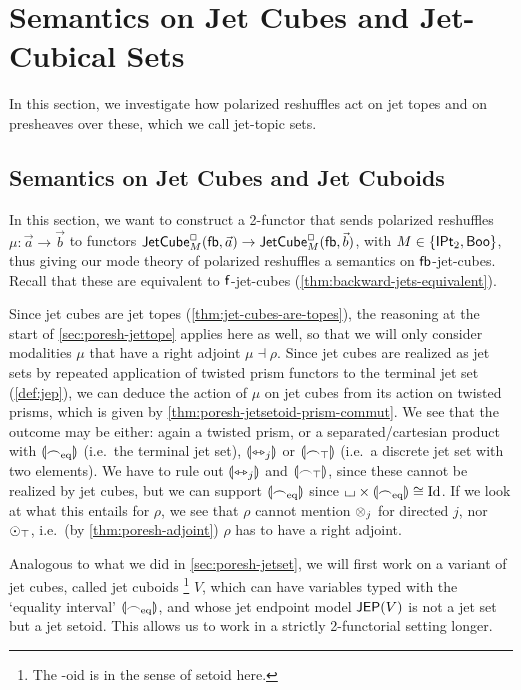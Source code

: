 \documentclass[a4paper]{memoir}
\begin{document}
\section{Semantics on Jet Cubes and Jet-Cubical Sets} \label{sec:poresh-jetcube-jcset}
In this section, we investigate how polarized reshuffles act on jet topes and on presheaves over these, which we call jet-topic sets.

\subsection{Semantics on Jet Cubes and Jet Cuboids} \label{sec:poresh-jetcube}
In this section, we want to construct a 2-functor that sends polarized reshuffles $\mu : \vec a \to \vec b$ to functors $\mathsf{JetCube}^{\Box}_{M}({\mathsf{fb}},\vec a) \to \mathsf{JetCube}^{\Box}_{M}({\mathsf{fb}},\vec b)$, with $M \in \mathopen{}\left\{ {\mathsf{IPt}_2}, \mathsf{Boo} \right\}\mathclose{}$, thus giving our mode theory of polarized reshuffles a semantics on ${\mathsf{fb}}$-jet-cubes.
Recall that these are equivalent to ${\mathsf{f}}$-jet-cubes (\cref{thm:backward-jets-equivalent}).

Since jet cubes are jet topes (\cref{thm:jet-cubes-are-topes}), the reasoning at the start of \cref{sec:poresh-jettope} applies here as well, so that we will only consider modalities $\mu$ that have a right adjoint $\mu \dashv \rho$.
Since jet cubes are realized as jet sets by repeated application of twisted prism functors to the terminal jet set (\cref{def:jep}), we can deduce the action of $\mu$ on jet cubes from its action on twisted prisms, which is given by \cref{thm:poresh-jetsetoid-prism-commut}.
We see that the outcome may be either: again a twisted prism, or a separated/cartesian product with ${\llparenthesis {\frown}_{\mathrm{eq}} \rrparenthesis}$ (i.e.\ the terminal jet set), ${\llparenthesis \leftrightarrowtriangle_j \rrparenthesis}$ or ${\llparenthesis {\frown}_\top \rrparenthesis}$ (i.e.\ a discrete jet set with two elements).
We have to rule out ${\llparenthesis \leftrightarrowtriangle_j \rrparenthesis}$ and ${\llparenthesis {\frown}_\top \rrparenthesis}$, since these cannot be realized by jet cubes, but we can support ${\llparenthesis {\frown}_{\mathrm{eq}} \rrparenthesis}$ since ${\llcorner\hspace{-.4ex}\lrcorner} \times {\llparenthesis {\frown}_{\mathrm{eq}}\rrparenthesis} \cong \mathrm{Id}$.
If we look at what this entails for $\rho$, we see that $\rho$ cannot mention ${\otimes}_j$ for directed $j$, nor ${\odot}_\top$, i.e.\ (by \cref{thm:poresh-adjoint}) $\rho$ has to have a right adjoint.

Analogous to what we did in \cref{sec:poresh-jetset}, we will first work on a variant of jet cubes, called jet cuboids%
\footnote{The -oid is in the sense of setoid here.}
$V$, which can have variables typed with the `equality interval' ${\llparenthesis {\frown}_{\mathrm{eq}} \rrparenthesis}$, and whose jet endpoint model $\mathsf{JEP}(V)$ is not a jet set but a jet setoid.
This allows us to work in a strictly 2-functorial setting longer.
\end{document}
